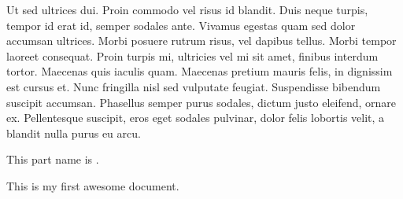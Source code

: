 \documentclass[oneside, a4paper]{book}
\begin{document}
Ut sed ultrices dui. Proin commodo vel risus id blandit. Duis neque turpis, tempor id erat id, semper sodales ante. Vivamus egestas quam sed dolor accumsan ultrices. Morbi posuere rutrum risus, vel dapibus tellus. Morbi tempor laoreet consequat. Proin turpis mi, ultricies vel mi sit amet, finibus interdum tortor. Maecenas quis iaculis quam. Maecenas pretium mauris felis, in dignissim est cursus et. Nunc fringilla nisl sed vulputate feugiat. Suspendisse bibendum suscipit accumsan. Phasellus semper purus sodales, dictum justo eleifend, ornare ex. Pellentesque suscipit, eros eget sodales pulvinar, dolor felis lobortis velit, a blandit nulla purus eu arcu. 

This part name is \thepart. 




This is my first awesome document. 
\end{document}
